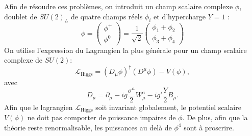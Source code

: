 Afin de résoudre ces problèmes, on introduit un champ scalaire complexe $\phi$, doublet de $SU(2)_{L}$ de quatre champs réels $\phi_{i}$ et d'hypercharge $Y=1$ :
\begin{equation}
\phi=\begin{pmatrix} 
\phi^{+}\\
\phi^{0}
\end{pmatrix}=\frac{1}{\sqrt{2}}\begin{pmatrix} 
\phi_{1}+\phi_{2}\\
\phi_{3}+\phi_{4}
\end{pmatrix}
\end{equation}
On utilise l'expression du Lagrangien la plus générale pour un champ scalaire complexe de $SU(2)$:
\begin{equation}
\mathcal{L}_{\mathrm{Higgs}}=\left(D_{\mu}\phi\right)^{\dagger}\left(D^{\mu}\phi\right)-V(\phi),
\end{equation}
avec 
\begin{equation}
D_{\mu}=\partial_{\mu} -ig\frac{\sigma^a}{2}W_{\mu}^{a}-ig'\frac{Y}{2}B_{\mu}.
\end{equation}
Afin que le lagrangien $\mathcal{L}_{\mathrm{Higgs}}$ soit invariant globalement, le potentiel scalaire $V(\phi)$ ne doit pas comporter de puissance impaires de $\phi$. De plus, afin que la théorie reste renormalisable, les puissances au delà de $\phi^4$ sont à proscrire.

